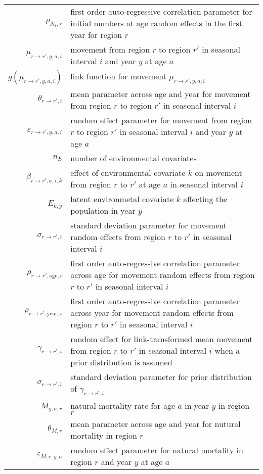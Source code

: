 \begin{longtable}[c]{r p{}}
$\rho_{N_1,r}$ & first order auto-regressive correlation parameter for initial numbers at age random effects in the first year for region $r$\\
$\mu_{r\rightarrow r',y,a,i}$ & movement from region $r$ to region $r'$ in seasonal interval $i$ and year $y$ at age $a$\\
$g(\mu_{r\rightarrow r',y,a,i})$ & link function for movement $\mu_{r\rightarrow r',y,a,i}$\\
$\theta_{r\rightarrow r',i}$ & mean parameter across age and year for movement from region $r$ to region $r'$ in seasonal interval $i$\\
$\varepsilon_{r\rightarrow r',y,a,i}$ &  random effect parameter for movement from region $r$ to region $r'$ in seasonal interval $i$ and year $y$ at age $a$\\
$n_E$ & number of environmental covariates\\
$\beta_{r \rightarrow r',a,i,k}$ & effect of environmental covariate $k$ on movement from region $r$ to $r'$ at age $a$ in seasonal interval $i$\\
$E_{k,y}$ & latent environmetal covariate $k$ affecting the population in year $y$\\
$\sigma_{r \rightarrow r',i}$ & standard deviation parameter for movement random effects from region $r$ to $r'$ in seasonal interval $i$\\
$\rho_{r \rightarrow r',\text{age},i}$ & first order auto-regressive correlation parameter across age for movement random effects from region $r$ to $r'$ in seasonal interval $i$\\
$\rho_{r \rightarrow r',\text{year},i}$ & first order auto-regressive correlation parameter across year for movement random effects from region $r$ to $r'$ in seasonal interval $i$\\
$\gamma_{r\rightarrow r',i}$ & random effect for link-transformed mean movement from region $r$ to $r'$ in seasonal interval $i$ when a prior distribution is assumed\\
$\sigma_{r\rightarrow r',i}$ & standard deviation parameter for prior distribution of $\gamma_{r\rightarrow r',i}$\\
$M_{y,a,r}$ & natural mortality rate for age $a$ in year $y$ in region $r$\\
$\theta_{M,r}$ & mean parameter across age and year for nutural mortality in region $r$\\
$\varepsilon_{M,r,y,a}$ & random effect parameter for natural mortality in region $r$ and year $y$ at age $a$\\

\end{longtable}
